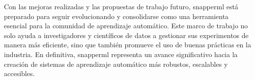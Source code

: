 Con las mejoras realizadas y las propuestas de trabajo futuro, \Gls{snapperml} está preparado para seguir evolucionando y consolidarse como una herramienta esencial para la comunidad de aprendizaje automático. Este marco de trabajo no solo ayuda a investigadores y científicos de datos a gestionar sus experimentos de manera más eficiente, sino que también promueve el uso de buenas prácticas en la industria. En definitiva, \Gls{snapperml} representa un avance significativo hacia la creación de sistemas de aprendizaje automático más robustos, escalables y accesibles.